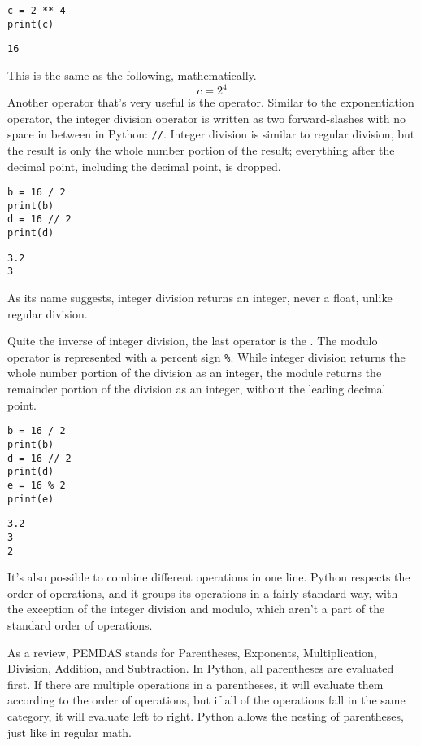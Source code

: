 \begin{lstlisting}[style=pippython]
c = 2 ** 4
print(c)
\end{lstlisting}
\begin{lstlisting}[style=none]
16
\end{lstlisting}
This is the same as the following, mathematically.
$$
c = 2^4
$$
Another operator that's very useful is the  operator. Similar to the exponentiation operator, the integer division operator is written as two forward-slashes with no space in between in Python: \verb|//|. Integer division is similar to regular division, but the result is only the whole number portion of the result; everything after the decimal point, including the decimal point, is dropped.\par
\begin{lstlisting}[style=pippython]
b = 16 / 2
print(b)
d = 16 // 2
print(d)
\end{lstlisting}
\begin{lstlisting}[style=none]
3.2
3
\end{lstlisting}
As its name suggests, integer division returns an integer, never a float, unlike regular division.\par
Quite the inverse of integer division, the last operator is the . The modulo operator is represented with a percent sign \verb|%|. While integer division returns the whole number portion of the division as an integer, the module returns the remainder portion of the division as an integer, without the leading decimal point.\par
\begin{lstlisting}[style=pippython]
b = 16 / 2
print(b)
d = 16 // 2
print(d)
e = 16 % 2
print(e)
\end{lstlisting}
\begin{lstlisting}[style=none]
3.2
3
2
\end{lstlisting}
It's also possible to combine different operations in one line. Python respects the order of operations, and it groups its operations in a fairly standard way, with the exception of the integer division and modulo, which aren't a part of the standard order of operations.\par
As a review, PEMDAS stands for Parentheses, Exponents, Multiplication, Division, Addition, and Subtraction. In Python, all parentheses are evaluated first. If there are multiple operations in a parentheses, it will evaluate them according to the order of operations, but if all of the operations fall in the same category, it will evaluate left to right. Python allows the nesting of parentheses, just like in regular math.\par
